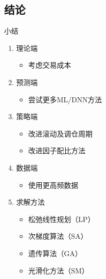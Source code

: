 \documentclass[CJK,aspectratio=43]{beamer}  %
\begin{document}
\subsection{结论}
\begin{frame}{小结}
	\begin{enumerate}
	\item 理论端
		\begin{itemize}
			\item 考虑交易成本
		\end{itemize}
	\item  预测端
		\begin{itemize}
			\item 尝试更多ML/DNN方法
		\end{itemize}
	\item  策略端
		\begin{itemize}
			\item 改进滚动及调仓周期
			\item 改进因子配比方法
		\end{itemize}
	\item  数据端
		\begin{itemize}
			\item 使用更高频数据
		\end{itemize}
	\item  求解方法
		\begin{itemize}
			\item 松弛线性规划（LP）
			\item 次梯度算法（SA）
			\item 遗传算法（GA）
			\item 光滑化方法（SM）
		\end{itemize}
	\end{enumerate}
\end{frame}
\end{document}
